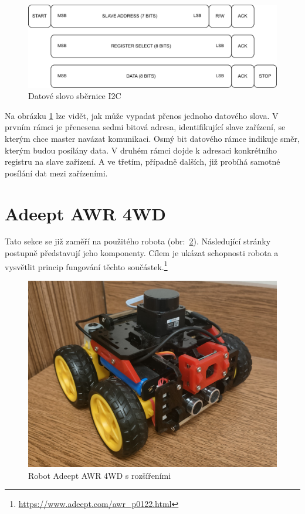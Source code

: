 \begin{figure}[h!]
	\centering
	\includegraphics[scale=0.75]{obrazky-figures/i2c_data_word.pdf}
	\caption{Datové slovo sběrnice I2C}
	\label{fig:i2c_word}
\end{figure}

Na obrázku \ref{fig:i2c_word} lze vidět, jak může vypadat přenos jednoho datového slova. V prvním rámci je přenesena sedmi bitová adresa, identifikující slave zařízení, se kterým chce master navázat komunikaci. Osmý bit datového rámce indikuje směr, kterým budou posílány data. V druhém rámci dojde k adresaci konkrétního registru na slave zařízení. A ve třetím, případně dalších, již probíhá samotné posílání dat mezi zařízeními. \cite[str:~88]{embeded_robotics}

\section{Adeept AWR 4WD}
Tato sekce se již zaměří na použitého robota (obr:~\ref{fig:robot}). Následující stránky postupně představují jeho komponenty. Cílem je ukázat schopnosti robota a vysvětlit princip fungování těchto součástek.\footnote{\url{https://www.adeept.com/awr_p0122.html}}

\begin{figure}[h!]
	\centering
	\includegraphics[scale=0.2]{obrazky-figures/robot.jpg}
	\caption{Robot Adeept AWR 4WD s rozšířeními}
	\label{fig:robot}
\end{figure}

